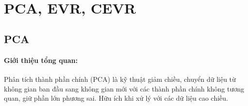 \section{PCA, EVR, CEVR}
\subsection{PCA}

\paragraph{Giới thiệu tổng quan:} 

\paragraph{}{Phân tích thành phần chính (PCA) là kỹ thuật giảm chiều, chuyển dữ liệu từ không gian ban đầu sang không gian mới với các thành phần chính không tương quan, giữ phần lớn phương sai. Hữu ích khi xử lý với các dữ liệu cao chiều.}

